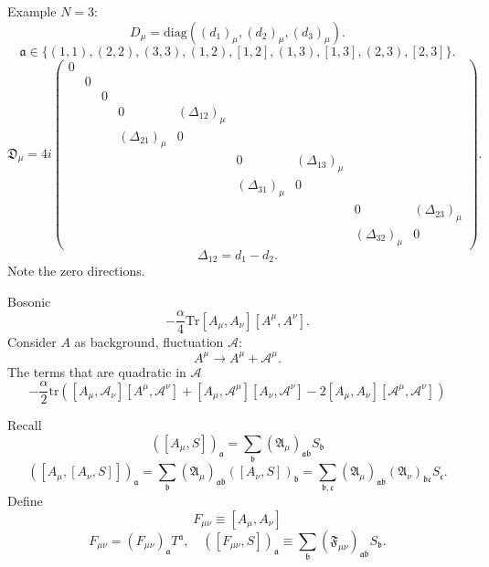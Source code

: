 \begin{correct}
	Example $N=3$:
	\[
	D_\mu = \mathrm{diag}((d_1)_\mu,(d_2)_\mu,(d_3)_\mu)
	.\] 
	\[
	\mathfrak{a} \in 
	\{(1,1),(2,2),(3,3),(1,2),[1,2],(1,3),[1,3],(2,3),[2,3]\}
	.\] 
	\[
	\mathfrak{D}_\mu = 4i
	\begin{pmatrix}
		0 & & & & & & & & \\
		& 0 & & & & & & & \\
		& & 0 & & & & & & \\
		& & & 0 & (\Delta_{12})_\mu& & & & \\
		& & & (\Delta_{21})_\mu& 0 & & & & \\
		& & & & & 0 & (\Delta_{13})_\mu& & \\
		& & & & & (\Delta_{31})_\mu& 0 & & \\
		& & & & & & & 0 & (\Delta_{23})_\mu\\
		& & & & & & & (\Delta_{32})_\mu& 0 
	\end{pmatrix}
	.\] 
	\[
		\Delta_{12} = d_1 - d_2
	.\] 
	Note the zero directions.
\end{correct}

Bosonic
\[
	- \frac{\alpha}{4} \mathrm{Tr} [A_\mu,A_\nu][A^\mu,A^\nu]
.\] 
Consider $A$ as background, fluctuation $\mathscr{A}$:
\[
A^\mu \to A^\mu + \mathscr{A}^\mu
.\] 
The terms that are quadratic in $\mathscr{A}$
\begin{equation}
	- \frac{\alpha}{2} \mathrm{tr} \left( 
	[A_\mu,\mathscr{A}_\nu][A^\mu,\mathscr{A}^\nu]
+[A_\mu,\mathscr{A}^\mu][A_\nu,\mathscr{A}^\nu]
- 2 [A_\mu,A_\nu][\mathscr{A}^\mu,\mathscr{A}^\nu]\right) 
\end{equation}

\begin{info}
	Recall
	\begin{equation}
		([A_\mu,S])_{\mathfrak{a}} = \sum_{\mathfrak{b}} (\mathfrak{A}_\mu)_{\mathfrak{a}\mathfrak{b}}
		S_{\mathfrak{b}}
	\end{equation}
	\[
		([A_\mu,[A_\nu,S]])_{\mathfrak{a}}
		= \sum_{\mathfrak{b}}
		(\mathfrak{A}_\mu)_{\mathfrak{a}\mathfrak{b}}
		([A_\nu,S])_{\mathfrak{b}}
		=\sum_{\mathfrak{b},\mathfrak{c}}
		(\mathfrak{A}_\mu)_{\mathfrak{a}\mathfrak{b}}
		(\mathfrak{A}_\nu)_{\mathfrak{b}\mathfrak{c}}
		S_{\mathfrak{c}}
	.\] 
	Define
	\begin{equation}
		F_{\mu\nu} \equiv [A_\mu,A_\nu]
	\end{equation}
	\[
		F_{\mu\nu} = (F_{\mu\nu})_{\mathfrak{a}} T^{\mathfrak{a}}
		,\quad
		([F_{\mu\nu},S])_{\mathfrak{a}}
		\equiv \sum_{\mathfrak{b}}
		(\mathfrak{F}_{\mu\nu})_{\mathfrak{a}\mathfrak{b}}
		S_{\mathfrak{b}}
	.\] 
\end{info}

